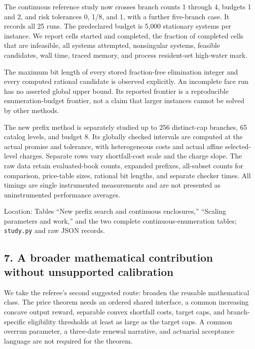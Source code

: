 \documentclass[11pt,letterpaper]{article}
\begin{document}
The continuous reference study now crosses branch counts 1 through 4, budgets 1 and 2, and risk tolerances 0, 1/8, and 1, with a further five-branch case. It records all 25 runs. The predeclared budget is 5,000 stationary systems per instance. We report cells started and completed, the fraction of completed cells that are infeasible, all systems attempted, nonsingular systems, feasible candidates, wall time, traced memory, and process resident-set high-water mark.



The maximum bit length of every stored fraction-free elimination integer and every computed rational candidate is observed explicitly. An incomplete face run has no asserted global upper bound. Its reported frontier is a reproducible enumeration-budget frontier, not a claim that larger instances cannot be solved by other methods.



The new prefix method is separately studied up to 256 distinct-cap branches, 65 catalog levels, and budget 8. Its globally checked intervals are computed at the actual promise and tolerance, with heterogeneous costs and actual affine selected-level charges. Separate rows vary shortfall-cost scale and the charge slope. The raw data retain evaluated-book counts, expanded prefixes, all-subset counts for comparison, price-table sizes, rational bit lengths, and separate checker times. All timings are single instrumented measurements and are not presented as uninstrumented performance averages.



Location: Tables “New prefix search and continuous enclosures,” “Scaling parameters and work,” and the two complete continuous-enumeration tables; \nolinkurl{study.py} and raw JSON records.



\subsection*{7. A broader mathematical contribution without unsupported calibration}


We take the referee's second suggested route: broaden the reusable mathematical class. The price theorem needs an ordered shared interface, a common increasing concave output reward, separable convex shortfall costs, target caps, and branch-specific eligibility thresholds at least as large as the target caps. A common overrun parameter, a three-date renewal narrative, and actuarial acceptance language are not required for the theorem.
\end{document}
